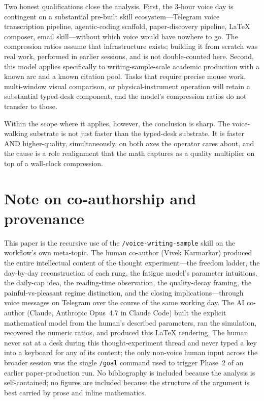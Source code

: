 \documentclass[11pt]{article}
\begin{document}
Two honest qualifications close the analysis. First, the 3-hour voice day is contingent on a substantial pre-built skill ecosystem---Telegram voice transcription pipeline, agentic-coding scaffold, paper-discovery pipeline, LaTeX composer, email skill---without which voice would have nowhere to go. The compression ratios assume that infrastructure exists; building it from scratch was real work, performed in earlier sessions, and is not double-counted here. Second, this model applies specifically to writing-sample-scale academic production with a known arc and a known citation pool. Tasks that require precise mouse work, multi-window visual comparison, or physical-instrument operation will retain a substantial typed-desk component, and the model's compression ratios do not transfer to those.

Within the scope where it applies, however, the conclusion is sharp. The voice-walking substrate is not just faster than the typed-desk substrate. It is faster AND higher-quality, simultaneously, on both axes the operator cares about, and the cause is a role realignment that the math captures as a quality multiplier on top of a wall-clock compression.

\section*{Note on co-authorship and provenance}

This paper is the recursive use of the \texttt{/voice-writing-sample} skill on the workflow's own meta-topic. The human co-author (Vivek Karmarkar) produced the entire intellectual content of the thought experiment---the freedom ladder, the day-by-day reconstruction of each rung, the fatigue model's parameter intuitions, the daily-cap idea, the reading-time observation, the quality-decay framing, the painful-vs-pleasant regime distinction, and the closing implications---through voice messages on Telegram over the course of the same working day. The AI co-author (Claude, Anthropic Opus~4.7 in Claude Code) built the explicit mathematical model from the human's described parameters, ran the simulation, recovered the numeric ratios, and produced this LaTeX rendering. The human never sat at a desk during this thought-experiment thread and never typed a key into a keyboard for any of its content; the only non-voice human input across the broader session was the single \texttt{/goal} command used to trigger Phase~2 of an earlier paper-production run. No bibliography is included because the analysis is self-contained; no figures are included because the structure of the argument is best carried by prose and inline mathematics.
\end{document}
